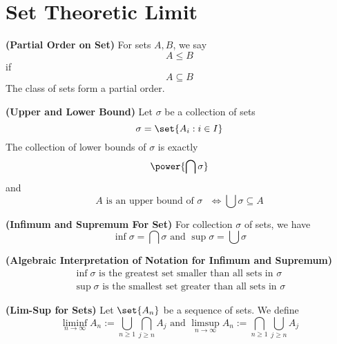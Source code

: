 \documentclass{report}
\begin{document}
\section{Set Theoretic Limit}
\begin{definition}
\label{0.7.1}
\textbf{(Partial Order on Set)} For sets $A,B$, we say
 \begin{equation}
A\leq B
\end{equation}
if
\begin{equation}
A\subseteq B
\end{equation}
The class of sets form a partial order.
\end{definition}
\begin{theorem}
\label{0.7.2}
\textbf{(Upper and Lower Bound)} Let $\sigma$ be a collection of sets
\begin{equation}
\sigma=\set{A_i:i\in I}
\end{equation}
The collection of lower bounds of $\sigma$ is exactly
\begin{equation}
\power{\bigcap \sigma}
\end{equation}
and 
\begin{equation}
A\text{ is an upper bound of $\sigma$ }\iff \bigcup \sigma \subseteq A
\end{equation}
\end{theorem}
\begin{definition}
\label{0.7.3}
\textbf{(Infimum and Supremum For Set)} For collection $\sigma$ of sets, we have
\begin{equation}
\inf \sigma= \bigcap \sigma\text{ and }\sup \sigma=\bigcup \sigma
\end{equation}
\end{definition}
\begin{theorem}
\label{0.7.4}
\textbf{(Algebraic Interpretation of Notation for Infimum and Supremum)} 
\begin{gather}
\inf\sigma\text{ is the greatest set smaller than all sets in }\sigma\\
\sup \sigma\text{ is the smallest set greater than all sets in }\sigma
\end{gather}
\end{theorem}
\begin{definition}
\label{0.7.5}
\textbf{(Lim-Sup for Sets)} Let $\set{A_n}$ be a sequence of sets. We define
\begin{equation}
\liminf_{n\to\infty} A_n:=\bigcup_{n\geq 1}\bigcap_{j\geq n}A_j\text{ and }\limsup_{n\to\infty} A_n:=\bigcap_{n\geq 1}\bigcup _{j\geq n}A_j
\end{equation}
\end{definition}
\end{document}
